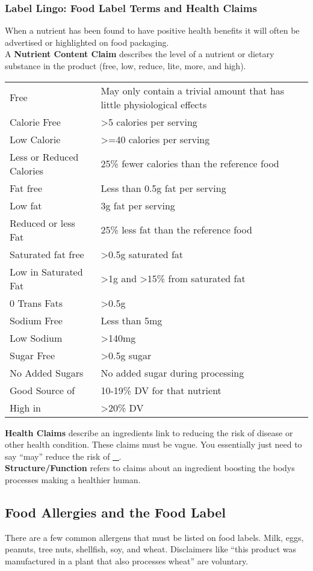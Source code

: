 \documentclass[letterpaper, 11pt]{article}
\begin{document}
\subsubsection{Label Lingo: Food Label Terms and Health Claims}
\label{sec:orgf8dc135}
When a nutrient has been found to have positive health benefits it will often be advertised or highlighted on food packaging.\\
A \textbf{Nutrient Content Claim} describes the level of a nutrient or dietary substance in the product (free, low, reduce, lite, more, and high).\\
\begin{center}
\begin{tabular}{ll}
Free & May only contain a trivial amount that has little physiological effects\\
Calorie Free & >5 calories per serving\\
Low Calorie & >=40 calories per serving\\
Less or Reduced Calories & 25\% fewer calories than the reference food\\
Fat free & Less than 0.5g fat per serving\\
Low fat & 3g fat per serving\\
Reduced or less Fat & 25\% less fat than the reference food\\
Saturated fat free & >0.5g saturated fat\\
Low in Saturated Fat & >1g and >15\% from saturated fat\\
0 Trans Fats & >0.5g\\
Sodium Free & Less than 5mg\\
Low Sodium & >140mg\\
Sugar Free & >0.5g sugar\\
No Added Sugars & No added sugar during processing\\
Good Source of & 10-19\% DV for that nutrient\\
High in & >20\% DV\\
\end{tabular}
\end{center}
\textbf{Health Claims} describe an ingredients link to reducing the risk of disease or other health condition. These claims must be vague. You essentially just need to say ``may'' reduce the risk of \uline{\uline{\_}}.\\
\textbf{Structure/Function} refers to claims about an ingredient boosting the bodys processes making a healthier human.\\
\subsection{Food Allergies and the Food Label}
\label{sec:orgafb50eb}
There are a few common allergens that must be listed on food labels. Milk, eggs, peanuts, tree nuts, shellfish, soy, and wheat. Disclaimers like ``this product was manufactured in a plant that also processes wheat'' are voluntary.\\
\end{document}
